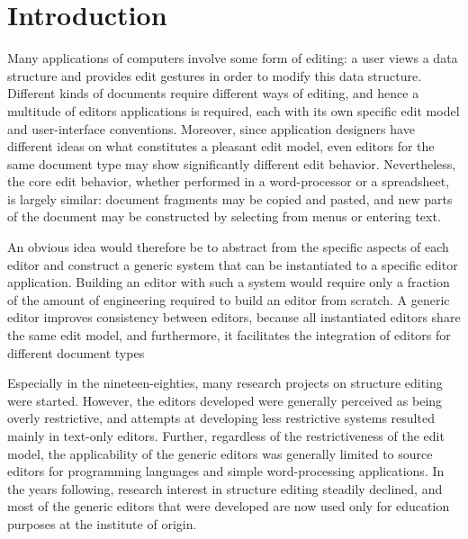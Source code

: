 \chapter{Introduction}
\label{chap:introduction}



Many applications of computers involve some form of editing: a user views a data structure and provides edit gestures in order to modify this data structure. Different kinds of documents require different ways of editing, and hence a multitude of editors applications is required, each with its own specific edit model and user-interface conventions. Moreover,  since application designers have different ideas on what constitutes a pleasant edit model, even editors for the same document type may show significantly different edit behavior. Nevertheless, the core edit behavior, whether performed in a word-processor or a spreadsheet, is largely similar: document fragments may be copied and pasted, and new parts of the document may be constructed by selecting from menus or entering text. 


An obvious idea would therefore be to abstract from the specific aspects of each editor and construct a generic system that can be instantiated to a specific editor application. Building an editor with such a system would require only a fraction of the amount of engineering required to build an editor from scratch. 
A generic editor improves consistency between editors, because all instantiated editors share the same edit model, and furthermore, it facilitates the integration of editors for different document types 




Especially in the nineteen-eighties, many research projects on structure editing were started. However, the editors developed were generally perceived as being overly restrictive, and attempts at developing less restrictive systems resulted mainly in text-only editors.  Further, regardless of the restrictiveness of the edit model, the applicability of the generic editors was generally limited to source editors for programming languages and simple word-processing applications.
In the years following, research interest in structure editing steadily declined, and most of the generic editors that were developed are now used only for education purposes at the institute of origin.

